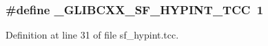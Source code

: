 \subsubsection[{\+\_\+\+G\+L\+I\+B\+C\+X\+X\+\_\+\+S\+F\+\_\+\+H\+Y\+P\+I\+N\+T\+\_\+\+T\+C\+C}]{\setlength{\rightskip}{0pt plus 5cm}\#define \+\_\+\+G\+L\+I\+B\+C\+X\+X\+\_\+\+S\+F\+\_\+\+H\+Y\+P\+I\+N\+T\+\_\+\+T\+C\+C~1}\label{sf__hypint_8tcc_acf643c2e2a7b3fab7ab4a8be18e29584}


Definition at line 31 of file sf\+\_\+hypint.\+tcc.

